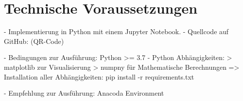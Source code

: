 \chapter{Technische Voraussetzungen}

- Implementierung in Python mit einem Jupyter Notebook. 
- Quellcode auf GitHub: (QR-Code)

- Bedingungen zur Ausführung: Python >= 3.7
- Python Abhängigkeiten:
	> matplotlib zur Visualisierung
	> numpny für Mathematische Berechnungen
	=> Installation aller Abhängigkeiten: pip install -r requirements.txt

- Empfehlung zur Ausführung: Anacoda Environment